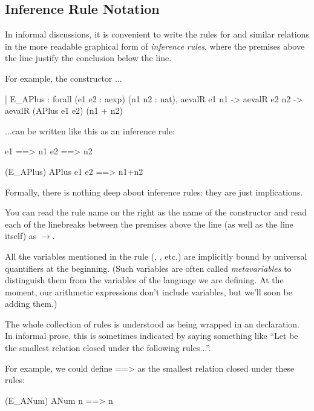 \documentclass[12pt]{report}
\begin{document}
\subsection{Inference Rule Notation}



 In informal discussions, it is convenient to write the rules
    for  and similar relations in the more readable graphical
    form of \textit{inference rules}, where the premises above the line
    justify the conclusion below the line.


    For example, the constructor ...


      | E\_APlus : forall (e1 e2 : aexp) (n1 n2 : nat),
          aevalR e1 n1 ->
          aevalR e2 n2 ->
          aevalR (APlus e1 e2) (n1 + n2)


    ...can be written like this as an inference rule:


                               e1 ==> n1
                               e2 ==> n2
\par
\noindent\hrulefill\par
\noindent{}                (E\_APlus)
                         APlus e1 e2 ==> n1+n2


 Formally, there is nothing deep about inference rules: they
    are just implications.


    You can read the rule name on the right as the name of the
    constructor and read each of the linebreaks between the premises
    above the line (as well as the line itself) as \ensuremath{\rightarrow}.


    All the variables mentioned in the rule (, , etc.) are
    implicitly bound by universal quantifiers at the beginning. (Such
    variables are often called \textit{metavariables} to distinguish them
    from the variables of the language we are defining.  At the
    moment, our arithmetic expressions don't include variables, but
    we'll soon be adding them.)


    The whole collection of rules is understood as being wrapped in an
     declaration.  In informal prose, this is sometimes
    indicated by saying something like ``Let  be the smallest
    relation closed under the following rules...''. 

 For example, we could define ==> as the smallest relation
    closed under these rules:
\par
\noindent\hrulefill\par
\noindent{}                               (E\_ANum)
                             ANum n ==> n
\end{document}
